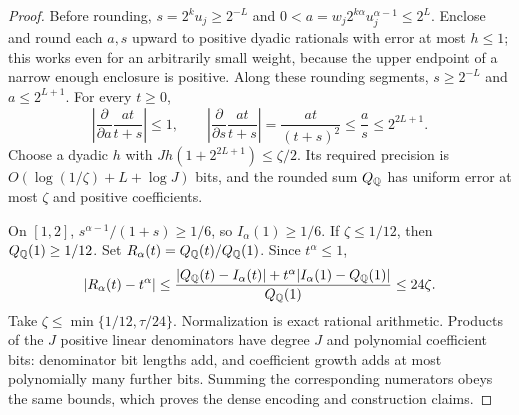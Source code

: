 \begin{proof}
Before rounding, $s=2^ku_j\ge2^{-L}$ and
$0<a=w_j2^{k\alpha}u_j^{\alpha-1}\le2^L$. Enclose and round each $a,s$
upward to positive dyadic rationals with error at most $h\le1$;
this works even for an arbitrarily small weight, because the upper
endpoint of a narrow enough enclosure is positive. Along these rounding
segments, $s\ge2^{-L}$ and $a\le2^{L+1}$. For every $t\ge0$,
\[
 \left|\frac{\partial}{\partial a}\frac{at}{t+s}\right|\le1,
 \qquad
 \left|\frac{\partial}{\partial s}\frac{at}{t+s}\right|
       =\frac{at}{(t+s)^2}\le\frac as\le2^{2L+1}.
\]
Choose a dyadic $h$ with
$Jh(1+2^{2L+1})\le\zeta/2$. Its required precision is
$O(\log(1/\zeta)+L+\log J)$ bits, and the rounded sum $Q_{\mathbb{Q}}$ has
uniform error at most $\zeta$ and positive coefficients.

On $[1,2]$, $s^{\alpha-1}/(1+s)\ge1/6$, so
$I_\alpha(1)\ge1/6$. If $\zeta\le1/12$, then $Q_{\mathbb{Q}}(1)\ge1/12$.
Set $R_\alpha(t)=Q_{\mathbb{Q}}(t)/Q_{\mathbb{Q}}(1)$. Since $t^\alpha\le1$,
\[
 |R_\alpha(t)-t^\alpha|
 \le\frac{|Q_{\mathbb{Q}}(t)-I_\alpha(t)|+
             t^\alpha|I_\alpha(1)-Q_{\mathbb{Q}}(1)|}{Q_{\mathbb{Q}}(1)}
 \le24\zeta.
\]
Take $\zeta\le\min\{1/12,\tau/24\}$. Normalization is exact rational
arithmetic. Products of the $J$ positive linear denominators have degree
$J$ and polynomial coefficient bits: denominator bit lengths add, and
coefficient growth adds at most polynomially many further bits.
Summing the corresponding numerators obeys the same bounds, which
proves the dense encoding and construction claims.
\end{proof}

